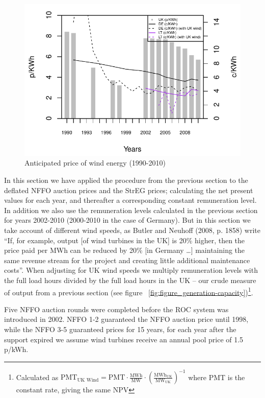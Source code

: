 \documentclass[a4paper, 12pt]{article}
\begin{document}
\begin{figure}
	\centering
	\includegraphics[width=1\textwidth]{fig_anticipated-price-energy}
	\caption{Anticipated price of wind energy (1990-2010)}
	\label{fig:fig_anticipated-price-energy}
\end{figure}

In this section we have applied the procedure from the previous section to the deflated NFFO auction prices and the StrEG prices; calculating the net present values for each year, and thereafter a corresponding constant remuneration level. In addition we also use the remuneration levels calculated in the previous section for years 2002-2010 (2000-2010 in the case of Germany). But in this section we take account of different wind speeds, as Butler and Neuhoff (2008, p. 1858) write ``If, for example, output [of wind turbines in the UK] is 20\% higher, then the price paid per MWh can be reduced by 20\% [in Germany …] maintaining the same revenue stream for the project and creating little additional maintenance costs''. When adjusting for UK wind speeds we multiply remuneration levels with the full load hours divided by the full load hours in the UK – our crude measure of output from a previous section (see figure ~\ref{fig:figure_generation-capacity})\footnote{Calculated as $\text{PMT}_\text{UK Wind} = \text{PMT} \cdot \frac{\text{MWh}}{\text{MW}} \cdot \left(\frac{\text{MWh}_\text{UK}}{\text{MW}_\text{UK}}\right)^{-1}$ where PMT is the constant rate, giving the same NPV}.

Five NFFO auction rounds were completed before the ROC system was introduced in 2002. NFFO 1-2 guaranteed the NFFO auction price until 1998, while the NFFO 3-5 guaranteed prices for 15 years, for each year after the support expired we assume wind turbines receive an annual pool price of 1.5 p/kWh. 
\end{document}
